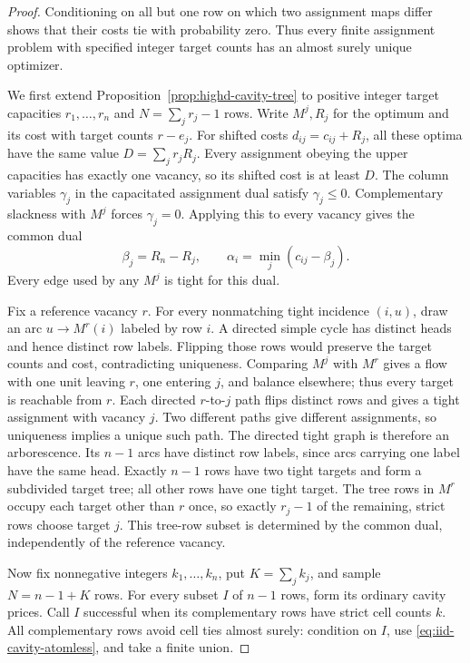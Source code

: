 \documentclass[11pt,reqno]{amsart}
\theoremstyle{definition}
\theoremstyle{remark}
\numberwithin{equation}{section}
\begin{document}
\begin{proof}
Conditioning on all but one row on which two assignment maps differ
shows that their costs tie with probability zero. Thus every finite
assignment problem with specified integer target counts has an almost
surely unique optimizer.

We first extend Proposition~\ref{prop:highd-cavity-tree} to positive
integer target capacities \(r_1,\ldots,r_n\) and
\(N=\sum_j r_j-1\) rows. Write \(M^j,R_j\) for the optimum and its
cost with target counts \(r-e_j\). For shifted costs
\(d_{ij}=c_{ij}+R_j\), all these optima have the same value
\(D=\sum_j r_jR_j\). Every assignment obeying the upper capacities
has exactly one vacancy, so its shifted cost is at least \(D\).
The column variables \(\gamma_j\) in the capacitated assignment dual
satisfy \(\gamma_j\le0\). Complementary slackness with \(M^j\)
forces \(\gamma_j=0\). Applying this to every vacancy gives the
common dual
\[
 \beta_j=R_n-R_j,\qquad
 \alpha_i=\min_j(c_{ij}-\beta_j).
\]
Every edge used by any \(M^j\) is tight for this dual.

Fix a reference vacancy \(r\). For every nonmatching tight incidence
\((i,u)\), draw an arc \(u\to M^r(i)\) labeled by row \(i\).
A directed simple cycle has distinct heads and hence distinct row
labels. Flipping those rows would preserve the target counts and cost,
contradicting uniqueness. Comparing \(M^j\) with \(M^r\) gives a
flow with one unit leaving \(r\), one entering \(j\), and balance
elsewhere; thus every target is reachable from \(r\). Each directed
\(r\)-to-\(j\) path flips distinct rows and gives a tight assignment
with vacancy \(j\). Two different paths give different assignments,
so uniqueness implies a unique such path. The directed tight graph is
therefore an arborescence. Its \(n-1\) arcs have distinct row labels,
since arcs carrying one label have the same head. Exactly \(n-1\)
rows have two tight targets and form a subdivided target tree; all
other rows have one tight target. The tree rows in \(M^r\) occupy
each target other than \(r\) once, so exactly \(r_j-1\) of the
remaining, strict rows choose target \(j\). This tree-row subset is
determined by the common dual, independently of the reference vacancy.

Now fix nonnegative integers \(k_1,\ldots,k_n\), put
\(K=\sum_j k_j\), and sample \(N=n-1+K\) rows. For every subset
\(I\) of \(n-1\) rows, form its ordinary cavity prices. Call \(I\)
successful when its complementary rows have strict cell counts \(k\).
All complementary rows avoid cell ties almost surely: condition on
\(I\), use \eqref{eq:iid-cavity-atomless}, and take a finite union.


\end{proof}
\end{document}
